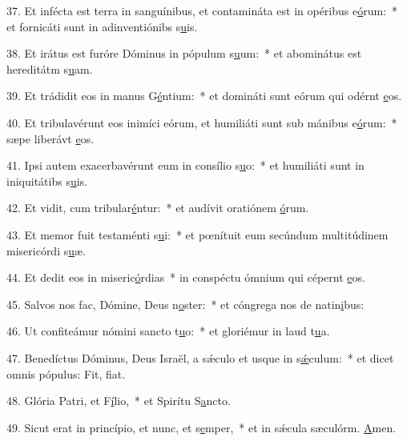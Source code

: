 37. Et infécta est terra in sanguínibus, et contamináta est in opéribus e\uline{ó}rum:~* et fornicáti sunt in adinventiónibs s\uline{u}is.\par 
38. Et irátus est furóre Dóminus in pópulum s\uline{u}um:~* et abominátus est hereditátm s\uline{u}am.\par 
39. Et trádidit eos in manus G\uline{é}ntium:~* et domináti sunt eórum qui odérnt \uline{e}os.\par 
40. Et tribulavérunt eos inimíci eórum, et humiliáti sunt sub mánibus e\uline{ó}rum:~* sæpe liberávt \uline{e}os.\par 
41. Ipsi autem exacerbavérunt eum in consílio s\uline{u}o:~* et humiliáti sunt in iniquitátibs s\uline{u}is.\par 
42. Et vidit, cum tribular\uline{é}ntur:~* et audívit oratiónem \uline{ó}rum.\par 
43. Et memor fuit testaménti s\uline{u}i:~* et pœnítuit eum secúndum multitúdinem misericórdi s\uline{u}æ.\par 
44. Et dedit eos in miseric\uline{ó}rdias~* in conspéctu ómnium qui cépernt \uline{e}os.\par 
45. Salvos nos fac, Dómine, Deus n\uline{o}ster:~* et cóngrega nos de natin\uline{i}bus:\par 
46. Ut confiteámur nómini sancto t\uline{u}o:~* et gloriémur in laud t\uline{u}a.\par 
47. Benedíctus Dóminus, Deus Israël, a sǽculo et usque in s\uline{ǽ}culum:~* et dicet omnis pópulus: Fit, f\uline{i}at.\par 
48. Glória Patri, et F\uline{í}lio,~* et Spirítu S\uline{a}ncto.\par 
49. Sicut erat in princípio, et nunc, et s\uline{e}mper,~* et in sǽcula sæculórm. \uline{A}men.\par 
